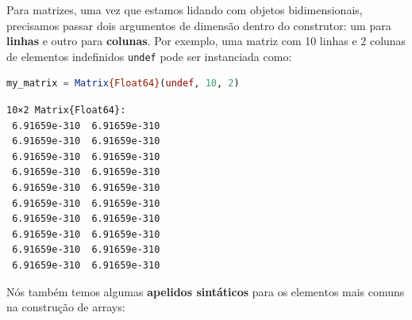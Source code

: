 \documentclass[
  notoc %
]{tufte-book}
\newcommand{\passthrough}[1]{#1}
\begin{document}
Para matrizes, uma vez que estamos lidando com objetos bidimensionais,
precisamos passar dois argumentos de dimensão dentro do construtor: um
para \textbf{linhas} e outro para \textbf{colunas}. Por exemplo, uma
matriz com 10 linhas e 2 colunas de elementos indefinidos
\passthrough{\lstinline!undef!} pode ser instanciada como:

\begin{lstlisting}[language=Julia]
my_matrix = Matrix{Float64}(undef, 10, 2)
\end{lstlisting}

\begin{lstlisting}[language=Output]
10×2 Matrix{Float64}:
 6.91659e-310  6.91659e-310
 6.91659e-310  6.91659e-310
 6.91659e-310  6.91659e-310
 6.91659e-310  6.91659e-310
 6.91659e-310  6.91659e-310
 6.91659e-310  6.91659e-310
 6.91659e-310  6.91659e-310
 6.91659e-310  6.91659e-310
 6.91659e-310  6.91659e-310
 6.91659e-310  6.91659e-310
\end{lstlisting}

Nós também temos algumas \textbf{apelidos sintáticos} para os elementos
mais comuns na construção de arrays:
\end{document}
